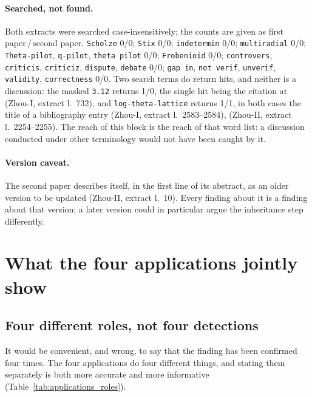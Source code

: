 \documentclass[11pt,a4paper]{article}
\theoremstyle{definition}
\newcommand{\anchor}[2]{(#1, extract l.~#2)}
\begin{document}
\paragraph{Searched, not found.} Both extracts were searched case-insensitively;
the counts are given as first paper\,/\,second paper. \texttt{Scholze} 0/0;
\texttt{Stix} 0/0; \texttt{indetermin} 0/0; \texttt{multiradial} 0/0;
\texttt{Theta-pilot}, \texttt{q-pilot}, \texttt{theta pilot} 0/0;
\texttt{Frobenioid} 0/0; \texttt{controvers}, \texttt{criticis}, \texttt{criticiz},
\texttt{dispute}, \texttt{debate} 0/0; \texttt{gap in}, \texttt{not verif},
\texttt{unverif}, \texttt{validity}, \texttt{correctness} 0/0. Two search terms do
return hits, and neither is a discussion: the masked \texttt{3.12} returns 1/0, the
single hit being the citation at \anchor{Zhou-I}{732}, and
\texttt{log-theta-lattice} returns 1/1, in both cases the title of a bibliography
entry \anchor{Zhou-I}{2583--2584}, \anchor{Zhou-II}{2254--2255}. The reach of this
block is the reach of that word list: a discussion conducted under other
terminology would not have been caught by it.

\paragraph{Version caveat.} The second paper describes itself, in the first line of
its abstract, as an older version to be updated \anchor{Zhou-II}{10}. Every
finding about it is a finding about that version; a later version could in
particular argue the inheritance step differently.

\section{What the four applications jointly show}
\label{sec:convergence}

\subsection{Four different roles, not four detections}

It would be convenient, and wrong, to say that the finding has been confirmed four
times. The four applications do four different things, and stating them separately
is both more accurate and more informative (Table~\ref{tab:applications_roles}).
\end{document}
